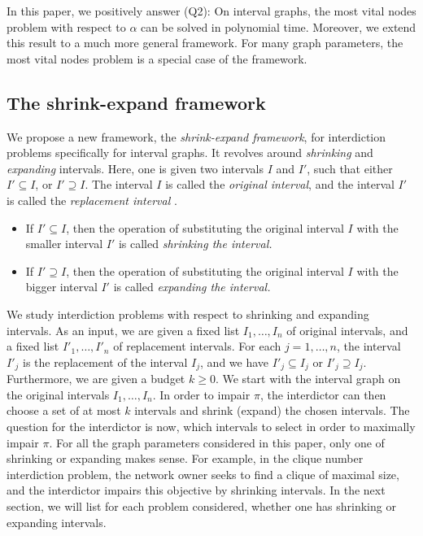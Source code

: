In this paper, we positively answer (Q2): On interval graphs, the most vital nodes problem with respect to $\alpha$ can be solved in polynomial time.  Moreover, we extend this result to a much more general framework. For many graph parameters, the most vital nodes problem is a special case of the framework.

\subsection{The shrink-expand framework} 
We propose a new framework, the \emph{shrink-expand framework}, for interdiction problems specifically 
for interval graphs. It revolves around \emph{shrinking} and \emph{expanding} intervals. Here, one is given two intervals $I$ and $I'$, such that either $I' \subseteq I$, or $I' \supseteq I$. The interval $I$ is called the \emph{original interval}, and the interval $I'$ is called the \emph{replacement interval} .
\begin{itemize}
\item If $I' \subseteq I$, then the operation of substituting the original interval $I$ with the smaller interval $I'$ is called \emph{shrinking the interval.}
\item  If $I' \supseteq I$, then the operation of substituting the original interval $I$ with the bigger interval $I'$ is called \emph{expanding the interval.}
\end{itemize}
 
We study interdiction problems with respect to shrinking and expanding intervals. As an input, we are given a fixed list $I_1,\dots,I_n$ of original intervals, and a fixed list $I'_1,\dots,I'_n$ of replacement intervals. For each $j=1,\dots,n$, the interval $I'_j$ is the replacement of the interval $I_j$, and we have $I'_j \subseteq I_j$ or $I'_j \supseteq I_j$.
Furthermore, we are given a budget $k \geq 0$. We start with the interval graph on the original intervals $I_1,\dots,I_n$.
In order to impair $\pi$, the interdictor can then choose a set of at most $k$ intervals and shrink (expand) the chosen intervals.
The question for the interdictor is now, which intervals to select in order to maximally impair $\pi$. For all the graph parameters considered in this paper, only one of shrinking or expanding makes sense. For example, in the clique number interdiction problem, the network owner seeks to find a clique of maximal size, and the interdictor impairs this objective by shrinking intervals. In the next section, we will list for each problem considered, whether one has shrinking or expanding intervals.

